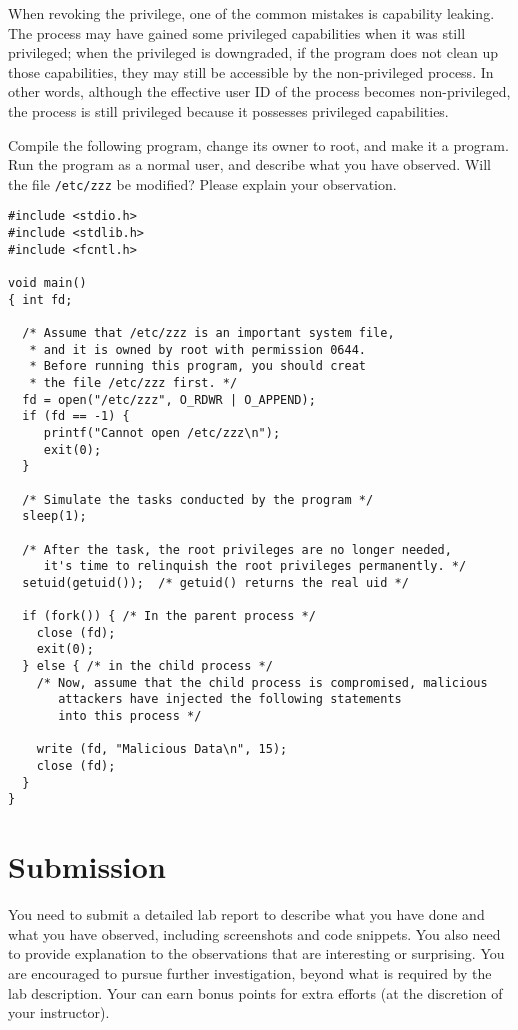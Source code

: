 When revoking the privilege, one of the common mistakes is capability
leaking. The process may have gained some privileged capabilities when it
was still privileged; when the privileged is downgraded, if the program
does not clean up those capabilities, they may still be accessible by the
non-privileged process. In other words, although the effective user ID of
the process becomes non-privileged, the process is still privileged because
it possesses privileged capabilities.


Compile the following program, change its owner to root, and
make it a \setuid program. Run the program as a normal user,
and describe what you have observed.
Will the file {\tt /etc/zzz} be modified? Please explain
your observation.

\begin{Verbatim}[frame=single]
#include <stdio.h>
#include <stdlib.h>
#include <fcntl.h>

void main()
{ int fd;

  /* Assume that /etc/zzz is an important system file,
   * and it is owned by root with permission 0644.
   * Before running this program, you should creat
   * the file /etc/zzz first. */
  fd = open("/etc/zzz", O_RDWR | O_APPEND);
  if (fd == -1) {
     printf("Cannot open /etc/zzz\n");
     exit(0);
  }

  /* Simulate the tasks conducted by the program */
  sleep(1);

  /* After the task, the root privileges are no longer needed,
     it's time to relinquish the root privileges permanently. */
  setuid(getuid());  /* getuid() returns the real uid */

  if (fork()) { /* In the parent process */
    close (fd);
    exit(0);
  } else { /* in the child process */
    /* Now, assume that the child process is compromised, malicious
       attackers have injected the following statements
       into this process */

    write (fd, "Malicious Data\n", 15);
    close (fd);
  }
}
\end{Verbatim}



\section{Submission}


You need to submit a detailed lab report to describe what you have done and
what you have observed, including screenshots and code snippets.
You also need to provide explanation to the
observations that are interesting or surprising. You are encouraged to
pursue further investigation, beyond what is required by the lab
description. Your can earn bonus points for extra efforts (at the
discretion of your instructor).





